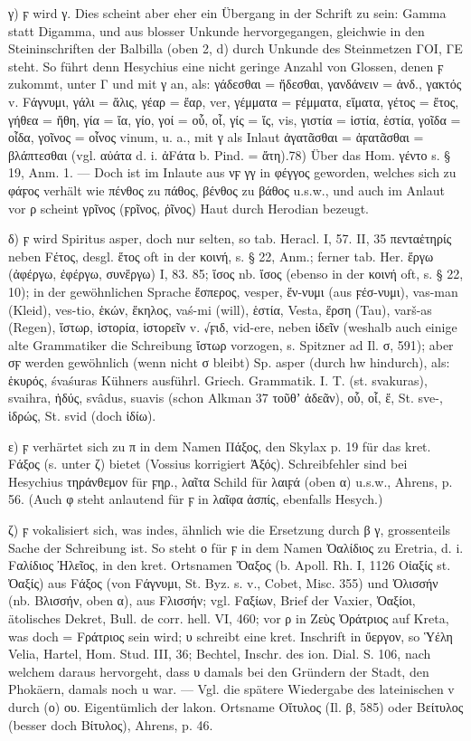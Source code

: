 γ) ϝ wird γ. Dies scheint aber eher ein Übergang in der Schrift zu sein: Gamma
statt Digamma, und aus blosser Unkunde hervorgegangen, gleichwie in den
Steininschriften der Balbilla (oben 2, d) durch Unkunde des Steinmetzen ΓΟΙ, ΓΕ
steht. So führt denn Hesychius eine nicht geringe Anzahl von Glossen, denen ϝ
zukommt, unter Γ und mit γ an, als: γάδεσθαι = ἥδεσθαι, γανδάνειν = ἁνδ., γακτός
v. Fάγνυμι, γάλι = ἅλις, γέαρ = ἔαρ, ver, γέμματα = ϝέμματα, εἵματα, γέτος =
ἔτος, γήθεα = ἤθη, γία = ἴα, γίο, γοί = οὗ, οἷ, γίς = ἴς, vis, γιστία = ἱστία,
ἑστία, γοῖδα = οἶδα, γοῖνος = οἶνος vinum, u. a., mit γ als Inlaut ἀγατᾶσθαι =
ἀϝατᾶσθαι = βλάπτεσθαι (vgl. αὐάτα d. i. ἀFάτα b. Pind. = ἄτη).78) Über das Hom.
γέντο s. § 19, Anm. 1. — Doch ist im Inlaute aus νϝ γγ in φέγγος geworden,
welches sich zu φάϝος verhält wie πένθος zu πάθος, βένθος zu βάθος u.s.w., und
auch im Anlaut vor ρ scheint γρῖνος (ϝρῖνος, ῥῖνος) Haut durch Herodian
bezeugt.

δ) ϝ wird Spiritus asper, doch nur selten, so tab. Heracl. I, 57. II, 35
πενταἑτηρίς neben Fέτος, desgl. ἕτος oft in der κοινή, s. § 22, Anm.; ferner
tab. Her. ἕργω (ἀφέργω, ἐφέργω, συνἕργω) I, 83. 85; ἵσος nb. ἴσος (ebenso in der
κοινή oft, s. § 22, 10); in der gewöhnlichen Sprache ἕσπερος,  vesper, ἕν-νυμι
(aus ϝέσ-νυμι),  vas-man (Kleid),  ves-tio, ἑκών, ἕκηλος,  vaś-mi
(will), ἑστία,  Vesta, ἕρση (Tau),  varš-as (Regen), ἵστωρ, ἱστορία,
ἱστορεῖν v. √ϝιδ, vid-ere, neben ἰδεῖν (weshalb auch einige alte
Grammatiker die Schreibung ἴστωρ vorzogen, s. Spitzner ad Il. σ, 591); aber σϝ
werden gewöhnlich (wenn nicht σ bleibt) Sp. asper (durch hw hindurch), als:
ἑκυρός,  śvaśuras Kühners ausführl. Griech. Grammatik. I. T.
(st. svakuras),  svaihra, ἡδύς,  svâdus,  suavis (schon Alkman 37
τοῦθʼ ἁδεᾶν), οὗ, οἷ, ἕ, St. sve-, ἱδρώς, St. svid (doch ἰδίω).

ε) ϝ verhärtet sich zu π in dem Namen Πάξος, den Skylax p. 19 für das kret.
Fάξος (s. unter ζ) bietet (Vossius korrigiert Ἀξός). Schreibfehler sind bei
Hesychius τηράνθεμον für ϝηρ., λαῖτα Schild für λαιϝά (oben α) u.s.w., Ahrens,
p. 56. (Auch φ steht anlautend für ϝ in λαῖφα ἀσπίς, ebenfalls Hesych.)

ζ) ϝ vokalisiert sich, was indes, ähnlich wie die Ersetzung durch β γ,
grossenteils Sache der Schreibung ist. So steht ο für ϝ in dem Namen Ὀαλίδιος zu
Eretria, d. i. Fαλίδιος Ἠλεῖος, in den kret. Ortsnamen Ὄαξος (b. Apoll. Rh. I,
1126 Οἰαξίς st. Ὀαξίς) aus Fάξος (von Fάγνυμι, St. Byz. s. v., Cobet, Misc. 355)
und Ὀλισσήν (nb. Βλισσήν, oben α), aus Fλισσήν; vgl. Fαξίων, Brief der Vaxier,
Ὀαξίοι, ätolisches Dekret, Bull. de corr. hell. VI, 460; vor ρ in Ζεὺς Ὀράτριος
auf Kreta, was doch = Fράτριος sein wird; υ schreibt eine kret. Inschrift in
ὔεργον, so Ὑέλη Velia, Hartel, Hom. Stud. III, 36; Bechtel, Inschr. des ion.
Dial. S. 106, nach welchem daraus hervorgeht, dass υ damals bei den Gründern der
Stadt, den Phokäern, damals noch u war. — Vgl. die spätere Wiedergabe des
lateinischen v durch (ο) ου. Eigentümlich der lakon. Ortsname Οἴτυλος (Il. β,
585) oder Βείτυλος (besser doch Βίτυλος), Ahrens, p. 46.

